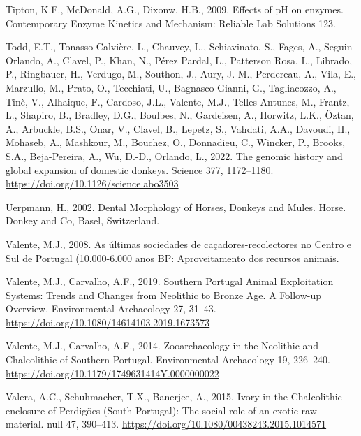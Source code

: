 \documentclass[preprint, 3p, authoryear]{elsarticle} %
\newlength{\cslhangindent}
\newlength{\cslentryspacingunit} %
\newenvironment{CSLReferences}[2] %
 {%
  \setlength{\parindent}{0pt}
  \ifodd #1
  \let\oldpar\par
  \def\par{\hangindent=\cslhangindent\oldpar}
  \fi
  \setlength{\parskip}{#2\cslentryspacingunit}
 }%
 {}
\begin{document}
\begin{CSLReferences}{1}{0}
\leavevmode{}%
Tipton, K.F., McDonald, A.G., Dixonw, H.B., 2009. Effects of {pH} on enzymes. Contemporary Enzyme Kinetics and Mechanism: Reliable Lab Solutions 123.

\leavevmode{}%
Todd, E.T., Tonasso-Calvière, L., Chauvey, L., Schiavinato, S., Fages, A., Seguin-Orlando, A., Clavel, P., Khan, N., Pérez Pardal, L., Patterson Rosa, L., Librado, P., Ringbauer, H., Verdugo, M., Southon, J., Aury, J.-M., Perdereau, A., Vila, E., Marzullo, M., Prato, O., Tecchiati, U., Bagnasco Gianni, G., Tagliacozzo, A., Tinè, V., Alhaique, F., Cardoso, J.L., Valente, M.J., Telles Antunes, M., Frantz, L., Shapiro, B., Bradley, D.G., Boulbes, N., Gardeisen, A., Horwitz, L.K., Öztan, A., Arbuckle, B.S., Onar, V., Clavel, B., Lepetz, S., Vahdati, A.A., Davoudi, H., Mohaseb, A., Mashkour, M., Bouchez, O., Donnadieu, C., Wincker, P., Brooks, S.A., Beja-Pereira, A., Wu, D.-D., Orlando, L., 2022. The genomic history and global expansion of domestic donkeys. Science 377, 1172--1180. \url{https://doi.org/10.1126/science.abo3503}

\leavevmode{}%
Uerpmann, H., 2002. Dental {Morphology} of {Horses}, {Donkeys} and {Mules}. Horse. Donkey and Co, Basel, Switzerland.

\leavevmode{}%
Valente, M.J., 2008. As últimas sociedades de caçadores-recolectores no {Centro} e {Sul} de {Portugal} (10.000-6.000 anos {BP}: Aproveitamento dos recursos animais.

\leavevmode{}%
Valente, M.J., Carvalho, A.F., 2019. Southern {Portugal Animal Exploitation Systems}: {Trends} and {Changes} from {Neolithic} to {Bronze Age}. {A Follow-up Overview}. Environmental Archaeology 27, 31--43. \url{https://doi.org/10.1080/14614103.2019.1673573}

\leavevmode{}%
Valente, M.J., Carvalho, A.F., 2014. Zooarchaeology in the {Neolithic} and {Chalcolithic} of {Southern Portugal}. Environmental Archaeology 19, 226--240. \url{https://doi.org/10.1179/1749631414Y.0000000022}

\leavevmode{}%
Valera, A.C., Schuhmacher, T.X., Banerjee, A., 2015. Ivory in the {Chalcolithic} enclosure of {Perdigões} ({South Portugal}): The social role of an exotic raw material. null 47, 390--413. \url{https://doi.org/10.1080/00438243.2015.1014571}


\end{CSLReferences}
\end{document}

